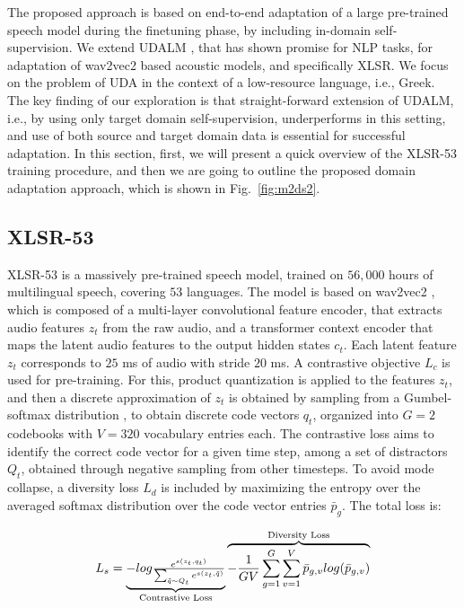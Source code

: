 \documentclass[journal]{IEEEtran}
\begin{document}
The proposed approach is based on end-to-end adaptation of a large pre-trained speech model during the finetuning phase, by including in-domain self-supervision. We extend UDALM \cite{karouzos-etal-2021-udalm}, that has shown promise for NLP tasks, for adaptation of wav2vec2 based acoustic models, and specifically XLSR. We focus on the problem of UDA in the context of a low-resource language, i.e., Greek. The key finding of our exploration is that straight-forward extension of UDALM, i.e., by using only target domain self-supervision, underperforms in this setting, and use of both source and target domain data is essential for successful adaptation. In this section, first, we will present a quick overview of the XLSR-53 training procedure, and then we are going to outline the proposed domain adaptation approach, which is shown in Fig.~\ref{fig:m2ds2}.






\subsection{XLSR-53}

XLSR-53 \cite{conneau21_interspeech} is a massively pre-trained speech model, trained on $56,000$ hours of multilingual speech, covering $53$ languages. The model is based on wav2vec2 \cite{baevski2020wav2vec}, which is composed of a multi-layer convolutional feature encoder, that extracts audio features $z_t$ from the raw audio, and a transformer context encoder that maps the latent audio features to the output hidden states $c_t$.
Each latent feature $z_t$ corresponds to $25$ ms of audio with stride $20$ ms.
A contrastive objective $L_c$ is used for pre-training. For this, product quantization \cite{jegou2010product} is applied to the features $z_t$, and then a discrete approximation of $z_t$ is obtained by sampling from a Gumbel-softmax distribution \cite{gambel_soft}, to obtain discrete code vectors $q_t$, organized into $G=2$ codebooks with $V=320$ vocabulary entries each. The contrastive loss aims to identify the correct code vector for a given time step, among a set of distractors $Q_t$, obtained through negative sampling from other timesteps. To avoid mode collapse, a diversity loss $L_d$ is included by maximizing the entropy over the averaged softmax distribution over the code vector entries $\bar{p}_g$. The total loss is:

\begin{equation}
\label{eq:xlsr}
    L_s = \underbrace{
        \textstyle - log \frac{e^{s(z_t, q_t)}}{\sum_{\tilde{q} \sim Q_t} e ^{s(z_t, \tilde{q})}}
    }_{\mathclap{\text{Contrastive Loss}} } \overbrace{
        - \frac{1}{GV}\sum_{g=1}^{G}\sum_{v=1}^V \bar{p}_{g,v}log(\bar{p}_{g,v})
    }^{\mathclap{\text{Diversity Loss}}}
\end{equation}
\end{document}
